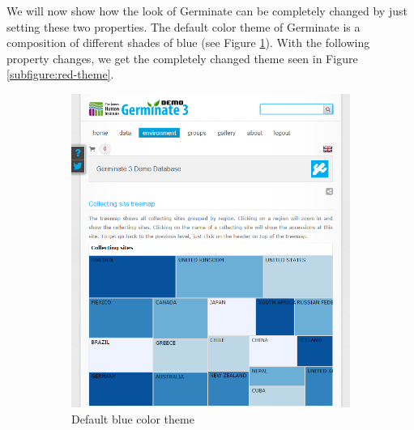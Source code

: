 \noindent
We will now show how the look of Germinate can be completely changed by just setting these two properties. The default color theme of Germinate is a composition of different shades of blue (see Figure \ref{subfigure:blue-theme}). With the following property changes, we get the completely changed theme seen in Figure \ref{subfigure:red-theme}.

\begin{figure}[h]
	\centering
	\begin{subfigure}[t]{0.48\textwidth}
		\includegraphics[width=\textwidth]{img/features/themes-blue.png}
		\caption{Default blue color theme}
		\label{subfigure:blue-theme}
	\end{subfigure}
	~
	\begin{subfigure}[t]{0.48\textwidth}

\end{subfigure}
\end{figure}
